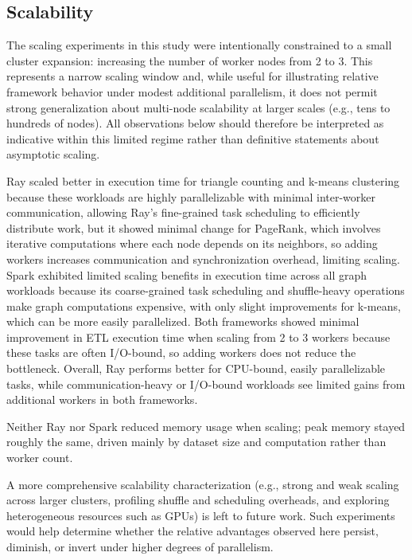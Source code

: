 \documentclass[conference]{IEEEtran}
\begin{document}
\subsection{Scalability}

The scaling experiments in this study were intentionally constrained to a small cluster expansion: 
increasing the number of worker nodes from 2 to 3. 
This represents a narrow scaling window and, while useful for illustrating relative framework behavior under modest additional parallelism, 
it does not permit strong generalization about multi-node scalability at larger scales (e.g., tens to hundreds of nodes). 
All observations below should therefore be interpreted as indicative within this limited regime rather than definitive statements about asymptotic scaling.


Ray scaled better in execution time for triangle counting and k-means clustering
because these workloads are highly parallelizable with minimal inter-worker communication,
allowing Ray’s fine-grained task scheduling to efficiently distribute work, but it showed
minimal change for PageRank, which involves iterative computations where each node depends
on its neighbors, so adding workers increases communication and synchronization overhead,
limiting scaling. Spark exhibited limited scaling benefits in execution time across all graph
workloads because its coarse-grained task scheduling and shuffle-heavy operations make graph
computations expensive, with only slight improvements for k-means, which can be more easily
parallelized. Both frameworks showed minimal improvement in ETL execution time when scaling
from 2 to 3 workers because these tasks are often I/O-bound, so adding workers does not reduce
the bottleneck. Overall, Ray performs better for CPU-bound, easily parallelizable tasks, while
communication-heavy or I/O-bound workloads see limited gains from additional workers in both
frameworks.

Neither Ray nor Spark reduced memory usage when scaling; peak memory stayed roughly the same, driven mainly by dataset size and computation rather than worker count.

A more comprehensive scalability characterization 
(e.g., strong and weak scaling across larger clusters, profiling shuffle and scheduling overheads, and exploring heterogeneous resources such as GPUs) 
is left to future work. Such experiments would help determine whether the relative advantages observed here persist, diminish, or invert under higher degrees of parallelism.
\end{document}
